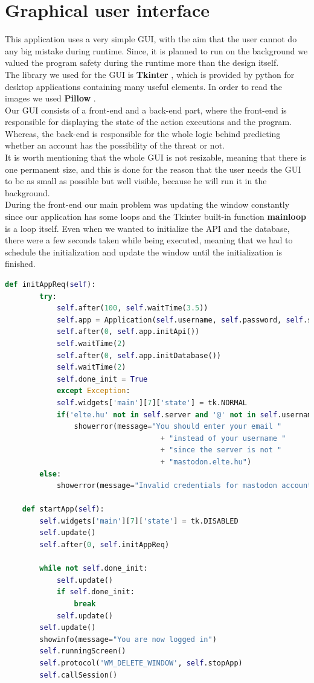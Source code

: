 \section{Graphical user interface}
This application uses a very simple GUI, with the aim that the user cannot do any big mistake during runtime.
Since, it is planned to run on the background we valued the program safety during the runtime more than the design
itself.
\\[5pt]
The library we used for the GUI is \textbf{Tkinter} \cite{tkinter}, which is provided by python for desktop applications containing many
useful elements. In order to read the images we used \textbf{Pillow} \cite{pil}.
\\[5pt]
Our GUI consists of a front-end and a back-end part, where the front-end is responsible for displaying the state of the action
executions and the program. Whereas, the back-end is responsible for the whole logic behind predicting whether an account has
the possibility of the threat or not.
\\[5pt]
It is worth mentioning that the whole GUI is not resizable, meaning that there is one permanent size, and this is done for the reason
that the user needs the GUI to be as small as possible but well visible, because he will run it in the background.
\\[5pt]
During the front-end our main problem was updating the window constantly since our application has some loops and the Tkinter
built-in function \textbf{mainloop} is a loop itself. Even when we wanted to initialize the API and the database, there were a few
seconds taken while being executed, meaning that we had to schedule the initialization and update the window until the initialization
is finished. 
\\[5pt]
\begin{lstlisting}[language=python, caption={Updating window while initializing the API and database}, captionpos=b]
	def initAppReq(self):
		try:
			self.after(100, self.waitTime(3.5))
			self.app = Application(self.username, self.password, self.server)
			self.after(0, self.app.initApi())
			self.waitTime(2)
			self.after(0, self.app.initDatabase())
			self.waitTime(2)
			self.done_init = True
			except Exception:
			self.widgets['main'][7]['state'] = tk.NORMAL
			if('elte.hu' not in self.server and '@' not in self.username):
				showerror(message="You should enter your email "
									+ "instead of your username "
									+ "since the server is not "
									+ "mastodon.elte.hu")
		else:
			showerror(message="Invalid credentials for mastodon account")
	
	def startApp(self):
		self.widgets['main'][7]['state'] = tk.DISABLED
		self.update()
		self.after(0, self.initAppReq)
		
		while not self.done_init:
			self.update()
			if self.done_init:
				break
			self.update()
		self.update()
		showinfo(message="You are now logged in")
		self.runningScreen()
		self.protocol('WM_DELETE_WINDOW', self.stopApp)
		self.callSession()
	
\end{lstlisting}
